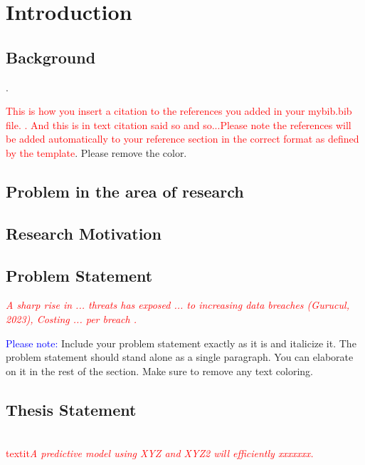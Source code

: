 \chapter{Introduction}
\section{Background}


\lipsum[1]. 

\textcolor{red} {This is how you insert a citation to the references you added in your mybib.bib file. \parencite{chung2014empirical}. And this is in text citation \textcite{du2017deeplog} said so and so...Please note the references will be added automatically to your reference section in the correct format as defined by the template}. Please remove the color. 


\section{Problem in the area of research}
\lipsum[1]

\section{Research Motivation}
 
\lipsum[1]

\section{Problem Statement}
\textcolor{red}{\textit{\textit{A sharp rise in  ... threats has exposed ... to increasing data breaches (Gurucul, 2023), Costing ... per breach \parencite{IBM2023CostDataBreach}.}}}\par

\textcolor{blue}{Please note:} Include your problem statement exactly as it is and italicize it. The problem statement should stand alone as a single paragraph. You can elaborate on it in the rest of the section. Make sure to remove any text coloring.
 
\lipsum[1]


\section{Thesis Statement}
\textcolor{red}{\\textit{\textit{A predictive model using XYZ and XYZ2 will efficiently xxxxxxx.}}}\par

